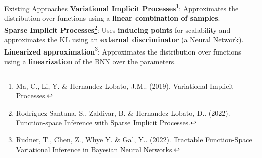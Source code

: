     \begin{frame}{Existing Approaches}
        \textbf{\alert{Variational Implicit Processes}}\footnote{
            Ma, C., Li, Y. \& Hernandez-Lobato, J.M.. (2019). Variational Implicit Processes.}: Approximates the distribution over functions using a \textbf{linear combination of samples}.\\
        \vspace{0.5cm}
        \textbf{\alert{Sparse Implicit Processes}}\footnote{
            Rodríguez-Santana, S., Zaldivar, B. \& Hernandez-Lobato, D.. (2022). Function-space Inference with Sparse Implicit Processes.}: Uses \textbf{inducing points} for scalability and approximates the KL using an \textbf{external discriminator} (a Neural Network).\\
        \vspace{0.5cm}
        \textbf{\alert{Linearized approximation}}\footnote{
            Rudner, T., Chen, Z., Whye Y. \& Gal, Y.. (2022). Tractable Function-Space Variational Inference in Bayesian Neural Networks.}: Approximates the distribution over functions using a \textbf{linearization} of the BNN over the parameters.
    \end{frame}

